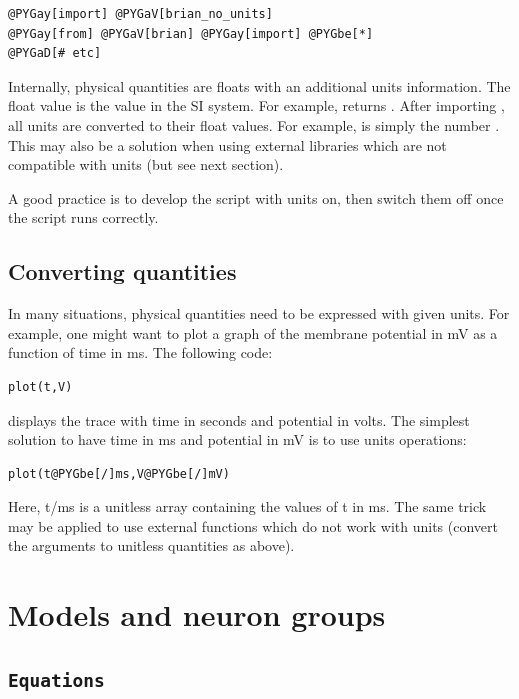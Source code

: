 \documentclass[letterpaper,10pt]{manual}
\begin{document}
\begin{Verbatim}[commandchars=@\[\]]
@PYGay[import] @PYGaV[brian_no_units]
@PYGay[from] @PYGaV[brian] @PYGay[import] @PYGbe[*]
@PYGaD[# etc]
\end{Verbatim}

Internally, physical quantities are floats with an additional units information. The float
value is the value in the SI system. For example,  returns .
After importing , all units are converted to their float values. For example,
 is simply the number .
This may also be a solution when using external libraries which are not compatible with units
(but see next section).

A good practice is to develop the script with units on, then switch them off once the script
runs correctly.


\subsection{Converting quantities}

In many situations, physical quantities need to be expressed with given units. For example,
one might want to plot a graph of the membrane potential in mV as a function of time in ms.
The following code:

\begin{Verbatim}[commandchars=@\[\]]
plot(t,V)
\end{Verbatim}

displays the trace with time in seconds and potential in volts. The simplest solution to have
time in ms and potential in mV is to use units operations:

\begin{Verbatim}[commandchars=@\[\]]
plot(t@PYGbe[/]ms,V@PYGbe[/]mV)
\end{Verbatim}

Here, t/ms is a unitless array containing the values of t in ms.
The same trick may be applied to use external functions which do not work with units
(convert the arguments to unitless quantities as above).

\resetcurrentobjects


\section{Models and neuron groups}


\subsection{\texttt{Equations}}
\end{document}
